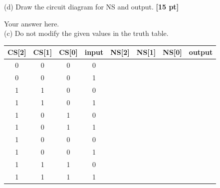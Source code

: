 \documentclass[a4paper]{article}
\begin{document}
(d) Draw the circuit diagram for NS and output. \textbf{[15 pt]}
\begin{answer}[Question 3]
        Your answer here. \\
        (c) Do not modify the given values in the truth table.\\
        \begin{center}
            \begin{tabular}{ |c|c|c|c||c|c|c|c| } 
             \hline
             CS[2] & CS[1] & CS[0] & input & NS[2] & NS[1] & NS[0] & output \\ 
             \hline
             0 & 0 & 0 & 0 &  &  &  &  \\ 
             \hline
             0 & 0 & 0 & 1 &  &  &  &  \\ 
             \hline
             1 & 1 & 0 & 0 &  &  &  &  \\ 
             \hline
             1 & 1 & 0 & 1 &  &  &  &  \\ 
             \hline
             1 & 0 & 1 & 0 &  &  &  &  \\ 
             \hline
             1 & 0 & 1 & 1 &  &  &  &  \\ 
             \hline
             1 & 0 & 0 & 0 &  &  &  &  \\ 
             \hline
             1 & 0 & 0 & 1 &  &  &  &  \\ 
             \hline
             1 & 1 & 1 & 0 &  &  &  &  \\ 
             \hline
             1 & 1 & 1 & 1 &  &  &  &  \\ 
             \hline
            \end{tabular}
        \end{center}
        
\end{answer}
\end{document}
